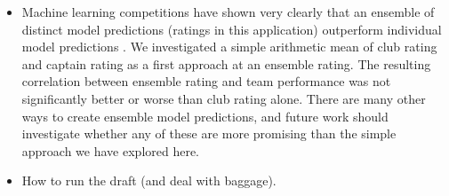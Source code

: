 \begin{itemize}
\item Machine learning competitions have shown very clearly that an ensemble of distinct model predictions (ratings in this application) outperform individual model predictions \cite{mlwave}. We investigated a simple arithmetic mean of club rating and captain rating as a first approach at an ensemble rating. The resulting correlation between ensemble rating and team performance was not significantly better or worse than club rating alone. There are many other ways to create ensemble model predictions, and future work should investigate whether any of these are more promising than the simple approach we have explored here.

\item How to run the draft (and deal with baggage).

\end{itemize}